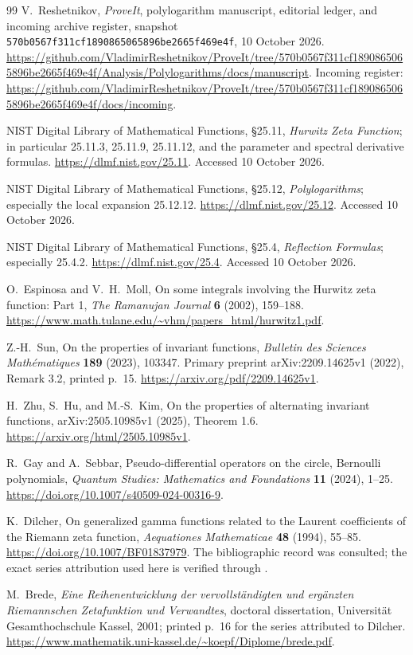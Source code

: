 \documentclass[11pt]{article}
\numberwithin{equation}{section}
\theoremstyle{definition}\newtheorem{definition}[theorem]{Definition}
\theoremstyle{remark}\newtheorem{remark}[theorem]{Remark}
\begin{document}
\begin{thebibliography}{99}
V.~Reshetnikov, \emph{ProveIt}, polylogarithm manuscript, editorial
ledger, and incoming archive register, snapshot
\texttt{570b0567f311cf1890865065896be2665f469e4f}, 10 October 2026.
\url{https://github.com/VladimirReshetnikov/ProveIt/tree/570b0567f311cf1890865065896be2665f469e4f/Analysis/Polylogarithms/docs/manuscript}.
Incoming register:
\url{https://github.com/VladimirReshetnikov/ProveIt/tree/570b0567f311cf1890865065896be2665f469e4f/docs/incoming}.

NIST Digital Library of Mathematical Functions, \S25.11,
\emph{Hurwitz Zeta Function}; in particular 25.11.3, 25.11.9,
25.11.12, and the parameter and spectral derivative formulas.
\url{https://dlmf.nist.gov/25.11}. Accessed 10 October 2026.

NIST Digital Library of Mathematical Functions, \S25.12,
\emph{Polylogarithms}; especially the local expansion 25.12.12.
\url{https://dlmf.nist.gov/25.12}. Accessed 10 October 2026.

NIST Digital Library of Mathematical Functions, \S25.4,
\emph{Reflection Formulas}; especially 25.4.2.
\url{https://dlmf.nist.gov/25.4}. Accessed 10 October 2026.

O.~Espinosa and V.~H.~Moll, On some integrals involving the Hurwitz
zeta function: Part 1, \emph{The Ramanujan Journal} \textbf{6}
(2002), 159--188.
\url{https://www.math.tulane.edu/~vhm/papers_html/hurwitz1.pdf}.

Z.-H.~Sun, On the properties of invariant functions,
\emph{Bulletin des Sciences Math\'ematiques} \textbf{189} (2023), 103347.
Primary preprint arXiv:2209.14625v1 (2022), Remark 3.2, printed p.~15.
\url{https://arxiv.org/pdf/2209.14625v1}.

H.~Zhu, S.~Hu, and M.-S.~Kim, On the properties of alternating invariant
functions, arXiv:2505.10985v1 (2025), Theorem 1.6.
\url{https://arxiv.org/html/2505.10985v1}.

R.~Gay and A.~Sebbar, Pseudo-differential operators on the circle,
Bernoulli polynomials, \emph{Quantum Studies: Mathematics and
Foundations} \textbf{11} (2024), 1--25.
\url{https://doi.org/10.1007/s40509-024-00316-9}.

K.~Dilcher, On generalized gamma functions related to the Laurent
coefficients of the Riemann zeta function,
\emph{Aequationes Mathematicae} \textbf{48} (1994), 55--85.
\url{https://doi.org/10.1007/BF01837979}.
The bibliographic record was consulted; the exact series attribution
used here is verified through \cite[printed p.~16]{Brede}.

M.~Brede, \emph{Eine Reihenentwicklung der vervollst\"andigten und
erg\"anzten Riemannschen Zetafunktion und Verwandtes}, doctoral
dissertation, Universit\"at Gesamthochschule Kassel, 2001;
printed p.~16 for the series attributed to Dilcher.
\url{https://www.mathematik.uni-kassel.de/~koepf/Diplome/brede.pdf}.
\end{thebibliography}
\end{document}
